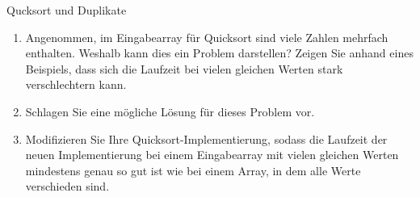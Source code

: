 \documentclass[11pt,a4paper]{article}
\begin{document}
\begin{aufgabe}{2}{Qucksort und Duplikate}
    \begin{enumerate}
        \item Angenommen, im Eingabearray für Quicksort sind viele Zahlen mehrfach enthalten.
        Weshalb kann dies ein Problem darstellen?
        Zeigen Sie anhand eines Beispiels, dass sich die Laufzeit bei vielen gleichen Werten stark verschlechtern kann.
        \item Schlagen Sie eine mögliche Lösung für dieses Problem vor.
        \item Modifizieren Sie Ihre Quicksort-Implementierung, sodass die Laufzeit der neuen Implementierung bei einem Eingabearray mit vielen gleichen Werten mindestens genau so gut ist wie bei einem Array, in dem alle Werte verschieden sind.
    \end{enumerate}
\end{aufgabe}

\end{document}
